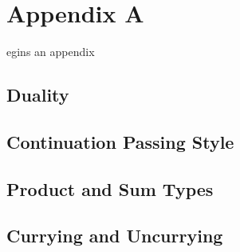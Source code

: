 %
%

\chapter{Appendix A}
\label{app:a}

egins an appendix\\

\section{Duality}
\section{Continuation Passing Style}
\section{Product and Sum Types}
\section{Currying and Uncurrying}









\
